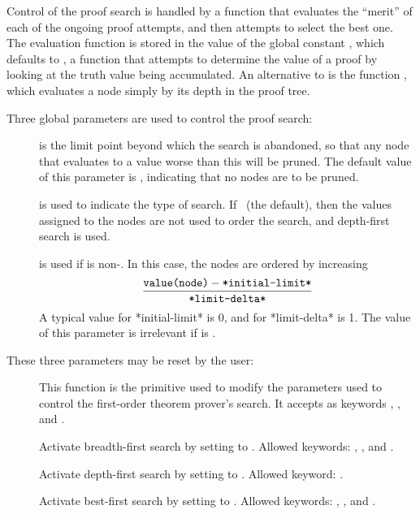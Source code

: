Control of the proof search is handled by a function that evaluates
the ``merit'' of each of the ongoing proof attempts, and then
attempts to select the best one.  The evaluation function is stored
in the value of the global constant ,
which defaults to , a function that attempts to
determine the value of a proof by looking at the truth value being
accumulated.  An alternative to  is the function
, which evaluates a node simply by its depth in the
proof tree.

Three global parameters are used to control the proof search:
 \begin{description}
 \item [] is the limit point beyond which the
search is abandoned, so that any node that evaluates to a value worse
than this will be pruned.  The default value of this parameter is
\NIL, indicating that no nodes are to be pruned.
 \item [] is used to indicate the type of search.
If \NIL\ (the default), then the values assigned to the nodes are not
used to order the search, and depth-first search is used.
 \item [] is used if  is
non-\NIL.  In this case, the nodes are ordered by increasing
 \[\frac{\mbox{\tt value(node)}-\mbox{\tt *initial-limit*}}{\mbox{\tt *limit-delta*}}\]
 A typical value for *initial-limit* is 0, and for *limit-delta* is
1.  The value of this parameter is irrelevant if
 is \NIL.
 \end{description}

These three parameters may be reset by the user:
 \begin{description}
 \item [] This function is the primitive
used to modify the parameters used to control the first-order theorem
prover's search.  It accepts as keywords ,
, and .
 \item [] Activate breadth-first search
by setting  to .  Allowed
keywords: , , and
.
 \item [] Activate depth-first search by
setting  to \NIL.  Allowed keyword:
.
 \item [] Activate best-first search by
setting  to .  Allowed
keywords: , , and
.
 \end{description}

